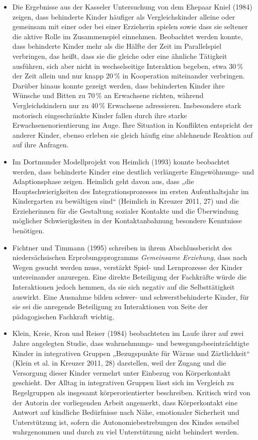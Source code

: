 \begin{itemize}
\item Die Ergebnisse aus der Kasseler Untersuchung von dem Ehepaar Kniel (1984) zeigen, dass behinderte Kinder häufiger als Vergleichskinder alleine oder gemeinsam mit einer oder bei einer Erzieherin spielen sowie dass sie seltener die aktive Rolle im Zusammenspiel einnehmen. Beobachtet werden konnte, dass behinderte Kinder mehr als die Hälfte der Zeit im Parallelspiel verbringen, das heißt, dass sie die gleiche oder eine ähnliche Tätigkeit ausführen, sich aber nicht in wechselseitige Interaktion begeben, etwa 30\,\% der Zeit allein und nur knapp 20\,\% in Kooperation miteinander verbringen. Darüber hinaus konnte gezeigt werden, dass behinderten Kinder ihre Wünsche und Bitten zu 70\,\% an Erwachsene richten, während Vergleichskindern nur zu 40\,\% Erwachsene adressieren. Insbesondere stark motorisch eingeschränkte Kinder fallen durch ihre starke Erwachsenenorientierung ins Auge. Ihre Situation in Konflikten entspricht der anderer Kinder, ebenso erleben sie gleich häufig eine ablehnende Reaktion auf auf ihre Anfragen.

\item Im Dortmunder Modellprojekt von Heimlich (1993) konnte beobachtet werden, dass behinderte Kinder eine deutlich verlängerte Eingewöhnungs- und Adaptions\-phase zeigen. Heimlich geht davon aus, dass „die Hauptschwierigkeiten des Integrationsprozesses im ersten Aufenthaltsjahr im Kindergarten zu bewältigen sind“ (Heimlich in Kreuzer 2011, 27) und die Erzieherinnen für die Gestaltung sozialer Kontakte und die Überwindung möglicher Schwierigkeiten in der Kontaktanbahnung besondere Kenntnisse benötigen.

\item Fichtner und Timmann (1995) schreiben in ihrem Abschlussbericht des niedersächsischen Erprobungsprogramms \emph{Gemeinsame Erziehung}, dass nach Wegen gesucht werden muss, verstärkt Spiel- und Lernprozesse der Kinder untereinander anzuregen. Eine direkte Beteiligung der Fachkräfte würde die Interaktionen jedoch hemmen, da sie sich negativ auf die Selbsttätigkeit auswirkt. Eine Ausnahme bilden schwer- und schwerstbehinderte Kinder, für sie sei die anregende Beteiligung zu Interaktionen von Seite der pädagogischen Fachkraft wichtig. 

\item Klein, Kreie, Kron und Reiser (1984) beobachteten im Laufe ihrer auf zwei Jahre angelegten Studie, dass wahrnehmungs- und bewegungsbeeinträchtigte Kinder in integrativen Gruppen „Bezugspunkte für Wärme und Zärtlichkeit“ (Klein et al. in Kreuzer 2011, 28) darstellen, weil der Zugang und die Versorgung dieser Kinder vermehrt unter Einbezug von Körperkontakt geschieht. Der Alltag in integrativen Gruppen lässt sich im Vergleich zu Regelgruppen als insgesamt körperorientierter beschreiben. Kritisch wird von der Autorin der vorliegenden Arbeit angemerkt, dass Körperkontakt eine Antwort auf kindliche Bedürfnisse nach Nähe, emotionaler Sicherheit und Unterstützung ist, sofern die Autonomiebestrebungen des Kindes sensibel wahrgenommen und durch zu viel Unterstützung nicht behindert werden.  


\end{itemize}
